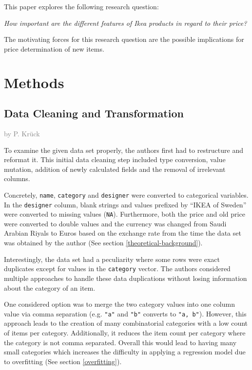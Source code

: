 \documentclass[a4paper, nobind]{templates/ociamthesis}
\begin{document}
This paper explores the following research question:

\emph{How important are the different features of Ikea products in regard to their price?}

The motivating forces for this research question are the possible implications for price determination of new items.

\hypertarget{methods}{%
\chapter{Methods}\label{methods}}

\hypertarget{datacleaning}{%
\section{Data Cleaning and Transformation}\label{datacleaning}}

\textcolor{gray}{by P. Krück}

To examine the given data set properly, the authors first had to restructure and reformat it. This initial data cleaning step included type conversion, value mutation, addition of newly calculated fields and the removal of irrelevant columns.

Concretely, \texttt{name}, \texttt{category} and \texttt{designer} were converted to categorical variables. In the \texttt{designer} column, blank strings and values prefixed by ``IKEA of Sweden'' were converted to missing values (\texttt{NA}). Furthermore, both the price and old price were converted to double values and the currency was changed from Saudi Arabian Riyals to Euros based on the exchange rate from the time the data set was obtained by the author (See section \ref{theoretical-background}).

Interestingly, the data set had a peculiarity where some rows were exact duplicates except for values in the \texttt{category} vector. The authors considered multiple approaches to handle these data duplications without losing information about the category of an item.

One considered option was to merge the two category values into one column value via comma separation (e.g. \texttt{"a"} and \texttt{"b"} converts to \texttt{"a,\ b"}). However, this approach leads to the creation of many combinatorial categories with a low count of items per category.
Additionally, it reduces the item count per category where the category is not comma separated.
Overall this would lead to having many small categories which increases the difficulty in applying a regression model due to overfitting (See section \ref{overfitting}).
\end{document}
